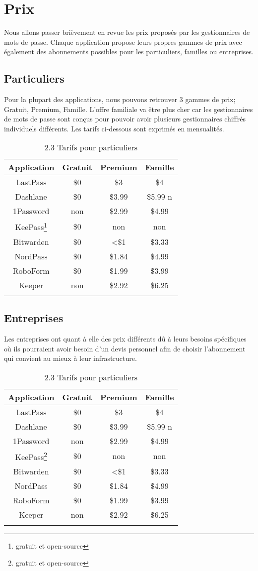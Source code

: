 \section{Prix}
Nous allons passer brièvement en revue les prix proposés par les gestionnaires de mots de passe. Chaque application propose leurs propres gammes de prix avec également des abonnements possibles pour les particuliers, familles ou entreprises. 
\subsection{Particuliers}
Pour la plupart des applications, nous pouvons retrouver 3 gammes de prix; Gratuit, Premium, Famille. L'offre familiale va être plus cher car les gestionnaires de mots de passe sont conçus pour pouvoir avoir plusieurs gestionnaires chiffrés individuels différents. 
Les tarifs ci-dessous sont exprimés en mensualités. \\
\begin{longtable}[h]{|c|c|c|c|}
		\hline
	Application & Gratuit & Premium & Famille \\
		\hline
	LastPass & \$0 & \$3 & \$4  \\
		\hline
	Dashlane & \$0 & \$3.99 & \$5.99 n \\
		\hline
	1Password & non & \$2.99 & \$4.99  \\
		\hline
	KeePass\footnote{gratuit et open-source} & \$0 & non & non   \\
		\hline
	Bitwarden & \$0 & <\$1 & \$3.33   \\
		\hline
	NordPass & \$0 & \$1.84 & \$4.99  \\
	\hline
	RoboForm & \$0 & \$1.99 & \$3.99    \\
	\hline
	Keeper & non & \$2.92 & \$6.25  \\
		\hline
			\caption{2.3 Tarifs pour particuliers}
\end{longtable}
\subsection{Entreprises}
Les entreprises ont quant à elle des prix différents dû à leurs besoins spécifiques où ils pourraient avoir besoin d'un devis personnel afin de choisir l'abonnement qui convient au mieux à leur infrastructure.
\begin{longtable}[h]{|c|c|c|c|}
	\hline
	Application & Gratuit & Premium & Famille \\
	\hline
	LastPass & \$0 & \$3 & \$4  \\
	\hline
	Dashlane & \$0 & \$3.99 & \$5.99 n \\
	\hline
	1Password & non & \$2.99 & \$4.99  \\
	\hline
	KeePass\footnote{gratuit et open-source} & \$0 & non & non   \\
	\hline
	Bitwarden & \$0 & <\$1 & \$3.33   \\
	\hline
	NordPass & \$0 & \$1.84 & \$4.99  \\
	\hline
	RoboForm & \$0 & \$1.99 & \$3.99    \\
	\hline
	Keeper & non & \$2.92 & \$6.25  \\
	\hline
	\caption{2.3 Tarifs pour particuliers}
\end{longtable}

